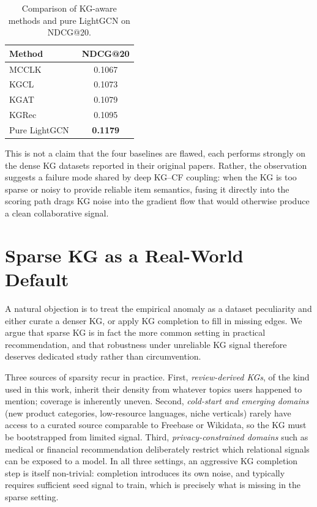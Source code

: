\begin{table}[H]
\centering
\caption{Comparison of KG-aware methods and pure LightGCN on NDCG@20.}
\label{tab:intro-baseline}
\begin{tabular}{lc}
\toprule
Method & NDCG@20 \\
\midrule
MCCLK~\cite{zou2022mcclk}      & 0.1067 \\
KGCL~\cite{yang2022kgcl}       & 0.1073 \\
KGAT~\cite{wang2019kgat}       & 0.1079 \\
KGRec~\cite{yang2023kgrec}     & 0.1095 \\
\midrule
Pure LightGCN~\cite{he2020lightgcn} & \textbf{0.1179} \\
\bottomrule
\end{tabular}
\end{table}
\FloatBarrier

This is not a claim that the four baselines are flawed, each performs strongly on the dense KG datasets reported in their original papers. Rather, the observation suggests a failure mode shared by deep KG--CF coupling: when the KG is too sparse or noisy to provide reliable item semantics, fusing it directly into the scoring path drags KG noise into the gradient flow that would otherwise produce a clean collaborative signal.

\section{Sparse KG as a Real-World Default}
\label{sec:intro-sparse-kg}

A natural objection is to treat the empirical anomaly as a dataset peculiarity and either curate a denser KG, or apply KG completion to fill in missing edges. We argue that sparse KG is in fact the more common setting in practical recommendation, and that robustness under unreliable KG signal therefore deserves dedicated study rather than circumvention.

Three sources of sparsity recur in practice. First, \emph{review-derived KGs}, of the kind used in this work, inherit their density from whatever topics users happened to mention; coverage is inherently uneven. Second, \emph{cold-start and emerging domains} (new product categories, low-resource languages, niche verticals) rarely have access to a curated source comparable to Freebase or Wikidata, so the KG must be bootstrapped from limited signal. Third, \emph{privacy-constrained domains} such as medical or financial recommendation deliberately restrict which relational signals can be exposed to a model. In all three settings, an aggressive KG completion step is itself non-trivial: completion introduces its own noise, and typically requires sufficient seed signal to train, which is precisely what is missing in the sparse setting.

